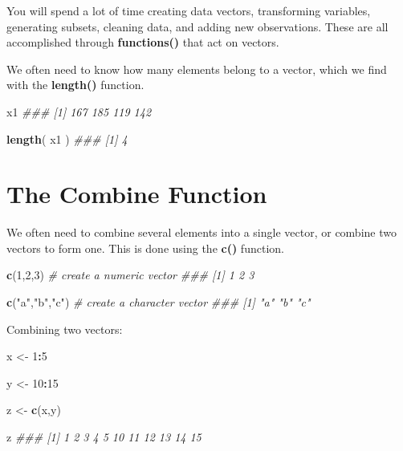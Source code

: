 \documentclass[]{book}
\newenvironment{Shaded}{\begin{snugshade}}{\end{snugshade}}
\newcommand{\CommentTok}[1]{\textcolor[rgb]{0.56,0.35,0.01}{\textit{#1}}}
\newcommand{\DecValTok}[1]{\textcolor[rgb]{0.00,0.00,0.81}{#1}}
\newcommand{\KeywordTok}[1]{\textcolor[rgb]{0.13,0.29,0.53}{\textbf{#1}}}
\newcommand{\NormalTok}[1]{#1}
\newcommand{\OperatorTok}[1]{\textcolor[rgb]{0.81,0.36,0.00}{\textbf{#1}}}
\newcommand{\StringTok}[1]{\textcolor[rgb]{0.31,0.60,0.02}{#1}}
\theoremstyle{definition}
\theoremstyle{definition}
\theoremstyle{definition}
\theoremstyle{remark}
\begin{document}
You will spend a lot of time creating data vectors, transforming
variables, generating subsets, cleaning data, and adding new
observations. These are all accomplished through \textbf{functions()}
that act on vectors.

We often need to know how many elements belong to a vector, which we
find with the \textbf{length()} function.

\begin{Shaded}
\begin{Highlighting}[]
\NormalTok{x1}
\CommentTok{### [1] 167 185 119 142}

\KeywordTok{length}\NormalTok{( x1 )}
\CommentTok{### [1] 4}
\end{Highlighting}
\end{Shaded}

\hypertarget{the-combine-function}{%
\section{The Combine Function}\label{the-combine-function}}

We often need to combine several elements into a single vector, or
combine two vectors to form one. This is done using the \textbf{c()}
function.

\begin{Shaded}
\begin{Highlighting}[]

\KeywordTok{c}\NormalTok{(}\DecValTok{1}\NormalTok{,}\DecValTok{2}\NormalTok{,}\DecValTok{3}\NormalTok{)        }\CommentTok{# create a numeric vector}
\CommentTok{### [1] 1 2 3}

\KeywordTok{c}\NormalTok{(}\StringTok{"a"}\NormalTok{,}\StringTok{"b"}\NormalTok{,}\StringTok{"c"}\NormalTok{)  }\CommentTok{# create a character vector}
\CommentTok{### [1] "a" "b" "c"}
\end{Highlighting}
\end{Shaded}

Combining two vectors:

\begin{Shaded}
\begin{Highlighting}[]

\NormalTok{x <-}\StringTok{ }\DecValTok{1}\OperatorTok{:}\DecValTok{5}

\NormalTok{y <-}\StringTok{ }\DecValTok{10}\OperatorTok{:}\DecValTok{15}

\NormalTok{z <-}\StringTok{ }\KeywordTok{c}\NormalTok{(x,y)}

\NormalTok{z}
\CommentTok{###  [1]  1  2  3  4  5 10 11 12 13 14 15}
\end{Highlighting}
\end{Shaded}
\end{document}
